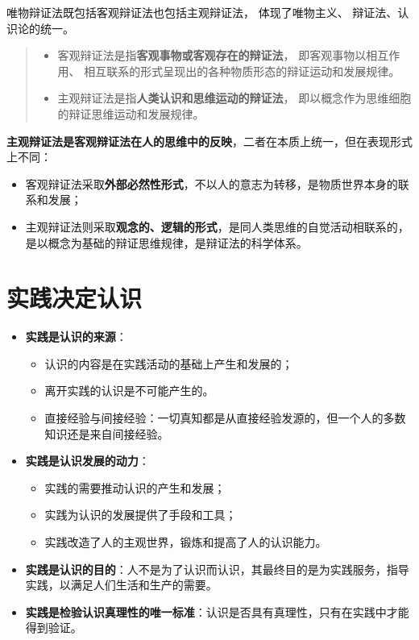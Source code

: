\documentclass[
]{article}
\begin{document}
唯物辩证法既包括客观辩证法也包括主观辩证法， 体现了唯物主义、
辩证法、认识论的统一。

\begin{quote}
\begin{itemize}
\item
  客观辩证法是指\textbf{客观事物或客观存在的辩证法}，
  即客观事物以相互作用、
  相互联系的形式呈现出的各种物质形态的辩证运动和发展规律。
\item
  主观辩证法是指\textbf{人类认识和思维运动的辩证法}，
  即以概念作为思维细胞的辩证思维运动和发展规律。
\end{itemize}
\end{quote}

\textbf{主观辩证法是客观辩证法在人的思维中的反映}，二者在本质上统一，但在表现形式上不同：

\begin{itemize}
\item
  客观辩证法采取\textbf{外部必然性形式}，不以人的意志为转移，是物质世界本身的联系和发展；
\item
  主观辩证法则采取\textbf{观念的、逻辑的形式}，是同人类思维的自觉活动相联系的，是以概念为基础的辩证思维规律，是辩证法的科学体系。
\end{itemize}

\hypertarget{ux5b9eux8df5ux51b3ux5b9aux8ba4ux8bc6}{%
\section{实践决定认识}\label{ux5b9eux8df5ux51b3ux5b9aux8ba4ux8bc6}}

\begin{itemize}
\item
  \textbf{实践是认识的来源}：

  \begin{itemize}
  \item
    认识的内容是在实践活动的基础上产生和发展的；
  \item
    离开实践的认识是不可能产生的。
  \item
    直接经验与间接经验：一切真知都是从直接经验发源的，但一个人的多数知识还是来自间接经验。
  \end{itemize}
\item
  \textbf{实践是认识发展的动力}：

  \begin{itemize}
  \item
    实践的需要推动认识的产生和发展；
  \item
    实践为认识的发展提供了手段和工具；
  \item
    实践改造了人的主观世界，锻炼和提高了人的认识能力。
  \end{itemize}
\item
  \textbf{实践是认识的目的}：人不是为了认识而认识，其最终目的是为实践服务，指导实践，以满足人们生活和生产的需要。
\item
  \textbf{实践是检验认识真理性的唯一标准}：认识是否具有真理性，只有在实践中才能得到验证。
\end{itemize}
\end{document}

